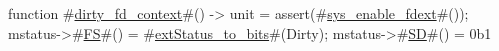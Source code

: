 function #\hyperref[sailRISCVzdirtyzyfdzycontext]{dirty\_fd\_context}#() -> unit = {
  assert(#\hyperref[sailRISCVzsyszyenablezyfdext]{sys\_enable\_fdext}#());
  mstatus->#\hyperref[sailRISCVzFS]{FS}#() = #\hyperref[sailRISCVzextStatuszytozybits]{extStatus\_to\_bits}#(Dirty);
  mstatus->#\hyperref[sailRISCVzSD]{SD}#() = 0b1
}
